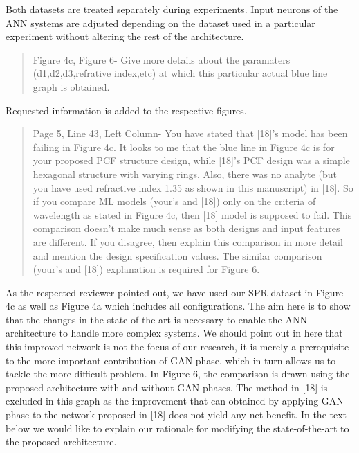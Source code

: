 \documentclass{article}
\begin{document}
	Both datasets are treated separately during experiments. Input neurons of the ANN systems are adjusted depending on the dataset used in a particular experiment without altering the rest of the architecture.
	
	
	\begin{quote}
	Figure 4c, Figure 6- Give more details about the paramaters (d1,d2,d3,refrative index,etc) at which this particular actual blue line graph is obtained.
	\end{quote}

	Requested information is added to the respective figures.
	
	
	\begin{quote}
	Page 5, Line 43, Left Column- You have stated that [18]'s model has been failing in Figure 4c. It looks to me that the blue line in Figure 4c is for your proposed PCF structure design, while [18]'s PCF design was a simple hexagonal structure with varying rings. Also, there was no analyte (but you have used refractive index 1.35 as shown in this manuscript) in [18]. So if you compare ML models (your's and [18]) only on the criteria of wavelength as stated in Figure 4c, then [18] model is supposed to fail. This comparison doesn't make much sense as both designs and input features are different. If you disagree, then explain this comparison in more detail and mention the design specification values.
	The similar comparison (your's and [18]) explanation is required for Figure 6.
	\end{quote}
	
	As the respected reviewer pointed out, we have used our SPR dataset in Figure 4c as well as Figure 4a which includes all configurations. The aim here is to show that the changes in the state-of-the-art is necessary to enable the ANN architecture to handle more complex systems. We should point out in here that this improved network is not the focus of our research, it is merely a prerequisite to the more important contribution of GAN phase, which in turn allows us to tackle the more difficult problem. In Figure 6, the comparison is drawn using the proposed architecture with and without GAN phases. The method in [18] is excluded in this graph as the improvement that can obtained by applying GAN phase to the network proposed in [18] does not yield any net benefit. In the text below we would like to explain our rationale for modifying the state-of-the-art to the proposed architecture.
	
\end{document}

